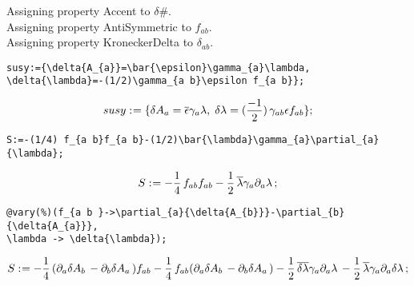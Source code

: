 \documentclass[11pt]{article}
\def\specialcolon{\mathrel{\mathop{:}}\hspace{-.5em}}
\renewcommand{\bar}[1]{\overline{#1}}
\begin{document}
Assigning property Accent to $\delta{\#}$.
\\
Assigning property AntiSymmetric to ${f}_{a b}$.
\\
Assigning property KroneckerDelta to $\delta_{a b}$.
\\
{\color[named]{Blue}\begin{verbatim}
susy:={\delta{A_{a}}=\bar{\epsilon}\gamma_{a}\lambda,
\delta{\lambda}=-(1/2)\gamma_{a b}\epsilon f_{a b}};
\end{verbatim}}
\begin{dmath*}[compact, spread=2pt]
susy\specialcolon{}= \{\delta{{A}_{a}} = \bar{\epsilon} {\gamma}_{a} \lambda,\; \delta{\lambda} = (\frac{-1}{2})\, {\gamma}_{a b} \epsilon {f}_{a b}\};
\end{dmath*}
{\color[named]{Blue}\begin{verbatim}
S:=-(1/4) f_{a b}f_{a b}-(1/2)\bar{\lambda}\gamma_{a}\partial_{a}{\lambda};
\end{verbatim}}
\begin{dmath*}[compact, spread=2pt]
S\specialcolon{}=  - \frac{1}{4}\, {f}_{a b} {f}_{a b} - \frac{1}{2}\, \bar{\lambda} {\gamma}_{a} {\partial}_{a}{\lambda}\, ;
\end{dmath*}
{\color[named]{Blue}\begin{verbatim}
@vary(%)(f_{a b }->\partial_{a}{\delta{A_{b}}}-\partial_{b}{\delta{A_{a}}},
\lambda -> \delta{\lambda});
\end{verbatim}}
\begin{dmath*}[compact, spread=2pt]
S\specialcolon{}=  - \frac{1}{4}\, ({\partial}_{a}{\delta{{A}_{b}}}\,  - {\partial}_{b}{\delta{{A}_{a}}}\, ) {f}_{a b} - \frac{1}{4}\, {f}_{a b} ({\partial}_{a}{\delta{{A}_{b}}}\,  - {\partial}_{b}{\delta{{A}_{a}}}\, ) - \frac{1}{2}\, \bar{\delta{\lambda}} {\gamma}_{a} {\partial}_{a}{\lambda}\,  - \frac{1}{2}\, \bar{\lambda} {\gamma}_{a} {\partial}_{a}{\delta{\lambda}}\, ;
\end{dmath*}
\end{document}

